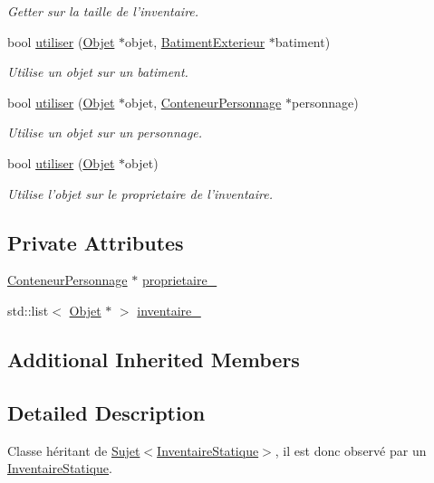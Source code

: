 \begin{DoxyCompactItemize}
\begin{DoxyCompactList}\small\item\em Getter sur la taille de l'inventaire. \end{DoxyCompactList}\item 
bool \hyperlink{classInventaire_a25a36411bdb3b7b6114d4e69464e1d09}{utiliser} (\hyperlink{classObjet}{Objet} $\ast$objet, \hyperlink{classBatimentExterieur}{Batiment\-Exterieur} $\ast$batiment)
\begin{DoxyCompactList}\small\item\em Utilise un objet sur un batiment. \end{DoxyCompactList}\item 
bool \hyperlink{classInventaire_af5785f8b4d951e22b96767f15a7a6c29}{utiliser} (\hyperlink{classObjet}{Objet} $\ast$objet, \hyperlink{classConteneurPersonnage}{Conteneur\-Personnage} $\ast$personnage)
\begin{DoxyCompactList}\small\item\em Utilise un objet sur un personnage. \end{DoxyCompactList}\item 
bool \hyperlink{classInventaire_ace421bd52ccf0f85e1436dbc0d923166}{utiliser} (\hyperlink{classObjet}{Objet} $\ast$objet)
\begin{DoxyCompactList}\small\item\em Utilise l'objet sur le proprietaire de l'inventaire. \end{DoxyCompactList}\end{DoxyCompactItemize}
\subsection*{Private Attributes}
\begin{DoxyCompactItemize}
\item 
\hyperlink{classConteneurPersonnage}{Conteneur\-Personnage} $\ast$ \hyperlink{classInventaire_ad7c98427f7fde20e588244073e3291ec}{proprietaire\-\_\-}
\item 
std\-::list$<$ \hyperlink{classObjet}{Objet} $\ast$ $>$ \hyperlink{classInventaire_a5a73a45ac898e657b6859032b2b3a590}{inventaire\-\_\-}
\end{DoxyCompactItemize}
\subsection*{Additional Inherited Members}


\subsection{Detailed Description}
Classe héritant de \hyperlink{classSujet}{Sujet$<$\-Inventaire\-Statique$>$}, il est donc observé par un \hyperlink{classInventaireStatique}{Inventaire\-Statique}. 

